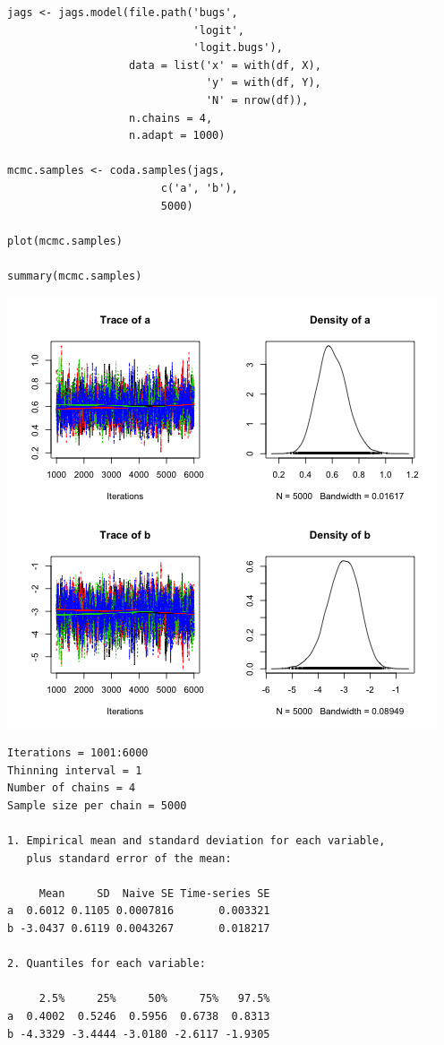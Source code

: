 \documentclass{beamer}
\begin{document}
\begin{frame}[fragile]
  \begin{verbatim}
jags <- jags.model(file.path('bugs',
                             'logit',
                             'logit.bugs'),
                   data = list('x' = with(df, X),
                               'y' = with(df, Y),
                               'N' = nrow(df)),
                   n.chains = 4,
                   n.adapt = 1000)
 
mcmc.samples <- coda.samples(jags,
                        c('a', 'b'),
                        5000)

plot(mcmc.samples)

summary(mcmc.samples)
  \end{verbatim}
\end{frame}

\begin{frame}[fragile]
  \begin{center}
    \includegraphics[scale = 0.4]{../graphs/logit/plot1.png}
  \end{center}
\end{frame}

\begin{frame}[fragile]
  \begin{verbatim}
Iterations = 1001:6000
Thinning interval = 1 
Number of chains = 4 
Sample size per chain = 5000 

1. Empirical mean and standard deviation for each variable,
   plus standard error of the mean:

     Mean     SD  Naive SE Time-series SE
a  0.6012 0.1105 0.0007816       0.003321
b -3.0437 0.6119 0.0043267       0.018217

2. Quantiles for each variable:

     2.5%     25%     50%     75%   97.5%
a  0.4002  0.5246  0.5956  0.6738  0.8313
b -4.3329 -3.4444 -3.0180 -2.6117 -1.9305
  \end{verbatim}
\end{frame}
\end{document}
